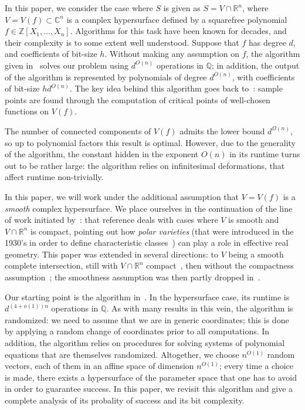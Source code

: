 \documentclass[sigconf]{acmart}
\def\C{\mathbb{C}}
\def\Q{\mathbb{Q}}
\def\R{\mathbb{R}}
\newcommand{\ZZ}{{\mathbb{Z}}}
\begin{document}
In this paper, we consider the case where $S$ is given as $S=V \cap
\R^n$, where $V=V(f) \subset \C^n$ is a complex hypersurface defined
by a squarefree polynomial $f \in \ZZ[X_1,\dots,X_n]$.
Algorithms for this task have been known for decades, and their
complexity is to some extent well understood. Suppose that $f$ has
degree $d$, and coefficients of bit-size $h$. Without making any
assumption on $f$, the algorithm given
in~\cite[Section~13.1]{BaPoRo03} solves our problem using $d^{O(n)}$
operations in $\Q$; in addition, the output of the algorithm is
represented by polynomials of degree $d^{O(n)}$, with coefficients of
bit-size $hd^{O(n)}$.  The key idea behind this algorithm goes back
to~\cite{GrVo88}: sample points are found through the computation of
critical points of well-chosen functions on $V(f)$.

The number of connected components of $V(f)$ admits the lower bound
$d^{\Omega(n)}$, so up to polynomial factors this result is
optimal. However, due to the generality of the algorithm, the constant
hidden in the exponent $O(n)$ in its runtime turns out to be rather
large: the algorithm relies on infinitesimal deformations, that affect
runtime non-trivially.

In this paper, we will work under the additional assumption that
$V=V(f)$ is a {\em smooth} complex hypersurface. We place ourselves in
the continuation of the line of work initiated by~\cite{BaGiHeMb97}:
that reference deals with cases where $V$ is smooth and $V \cap \R^n$
is compact, pointing out how {\em polar varieties} (that were
introduced in the 1930's in order to define characteristic
classes~\cite{Piene78,Teissier88}) can play a role in effective real
geometry. This paper was extended in several directions: to $V$ being
a smooth complete intersection, still with $V\cap \R^n$
compact~\cite{BaGiHeMb01}, then without the compactness
assumption~\cite{EMP,BaGiHePa05}; the smoothness assumption was then partly
dropped in~\cite{BaGiHe14,BaGiHeLePa12}.

Our starting point is the algorithm in~\cite{EMP}. In the hypersurface
case, its runtime is $d^{(4+o(1))n}$ operations in $\Q$.  As with many
results in this vein, the algorithm is randomized: we need to assume
that we are in generic coordinates; this is done by applying a random
change of coordinates prior to all computations. In addition, the
algorithm relies on procedures for solving systems of polynomial
equations that are themselves randomized.  Altogether, we choose
$n^{O(1)}$ random vectors, each of them in an affine space of
dimension $n^{O(1)}$; every time a choice is made, there exists a
hypersurface of the parameter space that one has to avoid in order to
guarantee success. In this paper, we revisit this algorithm and give a
complete analysis of its probality of success and its bit complexity.
\end{document}
